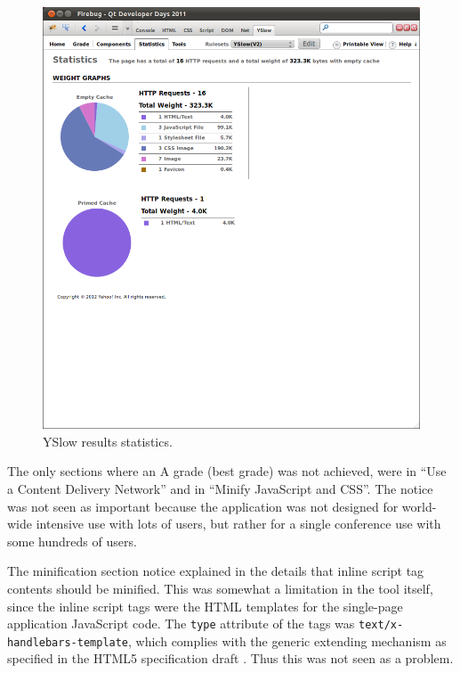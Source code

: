 \begin{figure}[ht]
  \begin{center}
    \includegraphics[width=\textwidth]{images/yslow-v2-statistics.png}
    \caption{YSlow results statistics.}
    \label{figure:yslow-v2-statistics.png}
  \end{center}
\end{figure}

The only sections where an A grade (best grade) was not achieved, were
in ``Use a Content Delivery Network'' and in ``Minify JavaScript and
CSS''. The  notice was not seen as important because the
application was not designed for world-wide intensive use with lots of
users, but rather for a single conference use with some hundreds of
users.

The minification section notice explained in the details that inline
script tag contents should be minified. This was somewhat a limitation
in the tool itself, since the inline script tags were the HTML
templates for the single-page application JavaScript code. The
\texttt{type} attribute of the tags was
\texttt{text/x-handlebars-template}, which complies with the generic
extending mechanism as specified in the HTML5 specification draft
\cite{HTML5draft}. Thus this was not seen as a problem.

